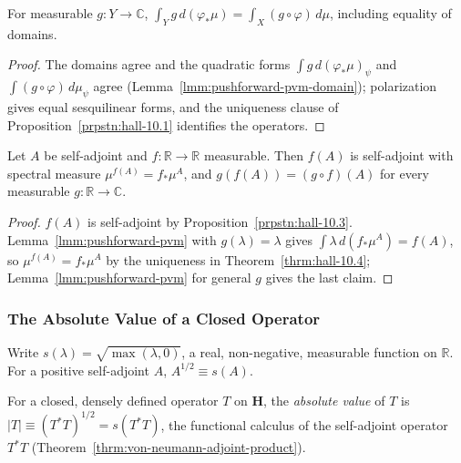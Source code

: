 \begin{lemma}
    \label{lmm:pushforward-pvm}
    \leanok
    For measurable $g : Y \to \mathbb{C}$, $\int_Y g \, d(\varphi_*\mu) = \int_X (g \circ \varphi) \, d\mu$, including equality of domains.
\end{lemma}
\begin{proof}
    \leanok
    The domains agree and the quadratic forms $\int g \, d(\varphi_*\mu)_\psi$ and $\int (g \circ \varphi) \, d\mu_\psi$ agree (Lemma~\ref{lmm:pushforward-pvm-domain}); polarization gives equal sesquilinear forms, and the uniqueness clause of Proposition~\ref{prpstn:hall-10.1} identifies the operators.
\end{proof}

\begin{corollary}
    \label{crllr:fc-of-fc}
    \leanok
    Let $A$ be self-adjoint and $f : \mathbb{R} \to \mathbb{R}$ measurable. Then $f(A)$ is self-adjoint with spectral measure $\mu^{f(A)} = f_*\mu^A$, and $g(f(A)) = (g \circ f)(A)$ for every measurable $g : \mathbb{R} \to \mathbb{C}$.
\end{corollary}
\begin{proof}
    \leanok
    $f(A)$ is self-adjoint by Proposition~\ref{prpstn:hall-10.3}. Lemma~\ref{lmm:pushforward-pvm} with $g(\lambda) = \lambda$ gives $\int \lambda \, d(f_*\mu^A) = f(A)$, so $\mu^{f(A)} = f_*\mu^A$ by the uniqueness in Theorem~\ref{thrm:hall-10.4}; Lemma~\ref{lmm:pushforward-pvm} for general $g$ gives the last claim.
\end{proof}

\subsubsection{The Absolute Value of a Closed Operator}

Write $s(\lambda) = \sqrt{\max(\lambda, 0)}$, a real, non-negative, measurable function on $\mathbb{R}$. For a positive self-adjoint $A$, $A^{1/2} \equiv s(A)$.

\begin{definition}
    \label{def:absolute-value}
    \leanok
    For a closed, densely defined operator $T$ on $\mathbf{H}$, the \emph{absolute value} of $T$ is $|T| \equiv (T^*T)^{1/2} = s(T^*T)$, the functional calculus of the self-adjoint operator $T^*T$ (Theorem~\ref{thrm:von-neumann-adjoint-product}).
\end{definition}

